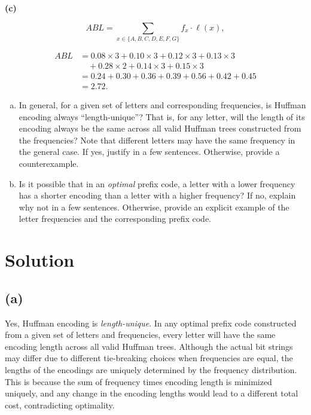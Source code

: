 \documentclass[11pt]{article}
\begin{document}
    \bigskip
    \textbf{(c) }

    \[
    ABL = \sum_{x \in \{A,B,C,D,E,F,G\}} f_x \cdot \ell(x),
    \]

    \[
    \begin{aligned}
    ABL &= 0.08 \times 3 + 0.10 \times 3 + 0.12 \times 3 + 0.13 \times 3 \\
        &\quad + 0.28 \times 2 + 0.14 \times 3 + 0.15 \times 3 \\
        &= 0.24 + 0.30 + 0.36 + 0.39 + 0.56 + 0.42 + 0.45 \\
        &= 2.72.
    \end{aligned}
    \]
    \newpage

    \begin{tcolorbox}[title={Problem 4 (Huffman Encoding, Short Answers, 15 points)}] \setlength\parindent{1em}
        \begin{enumerate}[(a)]
        \item In general, for a given set of letters and corresponding frequencies, is Huffman encoding always ``length-unique''? That is, for any letter, will the length of its encoding always be the same across all valid Huffman trees constructed from the frequencies? Note that different letters may have the same frequency in the general case. If yes, justify in a few sentences. Otherwise, provide a counterexample.
        \item Is it possible that in an \emph{optimal} prefix code, a letter with a lower frequency has a shorter encoding than a
        letter with a higher frequency? If no, explain why not in a few sentences. Otherwise, provide an explicit example of the letter frequencies and the corresponding prefix code.
        \end{enumerate}    
    \end{tcolorbox}
    
    \section*{Solution}

    \subsection*{(a)}
    Yes, Huffman encoding is \emph{length-unique}. In any optimal prefix code constructed from a given set of letters and frequencies, every letter will have the same encoding length across all valid Huffman trees. Although the actual bit strings may differ due to different tie-breaking choices when frequencies are equal, the lengths of the encodings are uniquely determined by the frequency distribution. This is because the sum of frequency times encoding length is minimized uniquely, and any change in the encoding lengths would lead to a different total cost, contradicting optimality.
\end{document}
